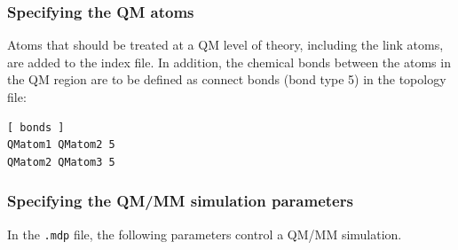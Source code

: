 \subsubsection{Specifying the QM atoms}

Atoms that should be treated at a QM level of theory, including the
link atoms, are added to the index file. In addition, the chemical
bonds between the atoms in the QM region are to be defined as
connect bonds (bond type 5) in the topology file:

{\small
\begin{verbatim}
[ bonds ]
QMatom1 QMatom2 5
QMatom2 QMatom3 5
\end{verbatim}}

\subsubsection{Specifying the QM/MM simulation parameters}

In the {\tt .mdp} file, the following parameters control a QM/MM simulation.

